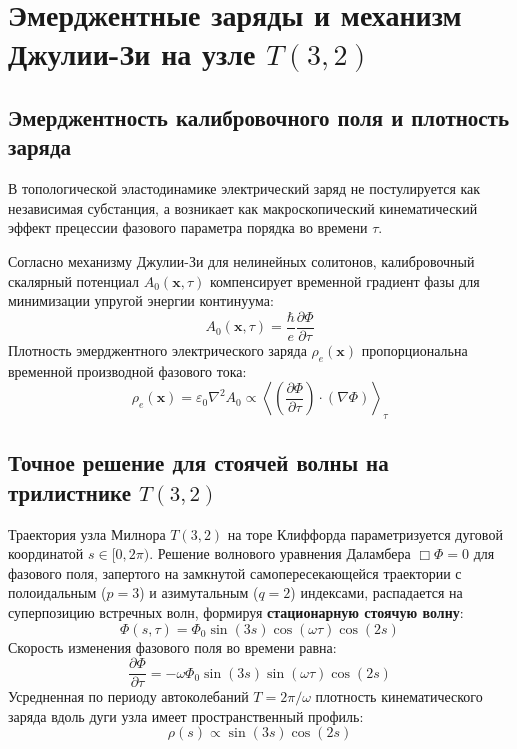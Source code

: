 \documentclass[12pt,a4paper]{article}
\begin{document}
\section{Эмерджентные заряды и механизм Джулии-Зи на узле $T(3,2)$}

\subsection{Эмерджентность калибровочного поля и плотность заряда}
В топологической эластодинамике электрический заряд не постулируется как независимая субстанция, а возникает как макроскопический кинематический эффект прецессии фазового параметра порядка во времени $\tau$.

Согласно механизму Джулии-Зи для нелинейных солитонов, калибровочный скалярный потенциал $A_0(\mathbf{x}, \tau)$ компенсирует временной градиент фазы для минимизации упругой энергии континуума:
\begin{equation}
	A_0(\mathbf{x}, \tau) = \frac{\hbar}{e} \frac{\partial \Phi}{\partial \tau}
\end{equation}
Плотность эмерджентного электрического заряда $\rho_e(\mathbf{x})$ пропорциональна временной производной фазового тока:
\begin{equation}
	\rho_e(\mathbf{x}) = \varepsilon_0 \nabla^2 A_0 \propto \left\langle \left( \frac{\partial \Phi}{\partial \tau} \right) \cdot (\nabla \Phi) \right\rangle_\tau
\end{equation}

\subsection{Точное решение для стоячей волны на трилистнике $T(3,2)$}
Траектория узла Милнора $T(3,2)$ на торе Клиффорда параметризуется дуговой координатой $s \in [0, 2\pi)$. 
Решение волнового уравнения Даламбера $\Box \Phi = 0$ для фазового поля, запертого на замкнутой самопересекающейся траектории с полоидальным ($p=3$) и азимутальным ($q=2$) индексами, распадается на суперпозицию встречных волн, формируя \textbf{стационарную стоячую волну}:
\begin{equation}
	\Phi(s, \tau) = \Phi_0 \sin(3s) \cos(\omega \tau) \cos(2s)
\end{equation}
Скорость изменения фазового поля во времени равна:
\begin{equation}
	\frac{\partial \Phi}{\partial \tau} = -\omega \Phi_0 \sin(3s) \sin(\omega \tau) \cos(2s)
\end{equation}
Усредненная по периоду автоколебаний $T = 2\pi/\omega$ плотность кинематического заряда вдоль дуги узла имеет пространственный профиль:
\begin{equation}
	\rho(s) \propto \sin(3s) \cos(2s)
\end{equation}
\end{document}
